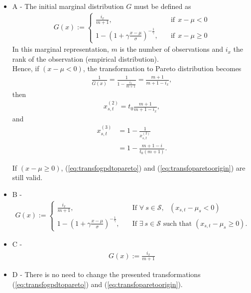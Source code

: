 \begin{itemize}
\item A - The initial marginal distribution $G$ must be defined as 
\begin{align*}
G(x) := \left\{
\begin{array}{rl}
  \frac{i_x}{m+1} , \quad &\text{if} \:\: x-\mu < 0 \\
  1 - \left( 1 + \gamma \frac{x - \mu}{{\sigma}} \right)^{-\frac{1}{\gamma}} , \quad &\text{if} \:\: x-\mu \geq 0 
\end{array}
\right.
\end{align*}
In this marginal representation, $m$ is the number of observations and $i_x$ the rank of the observation (empirical distribution).\\
Hence, if $(x-\mu < 0)$, the transformation to Pareto distribution becomes
\begin{align*}
\frac{1}{\overline{G}(x)} = \frac{1}{1-\frac{i_x}{m+1}} = \frac{m+1}{m+1-i_x},
\end{align*}
then
\begin{align*}
x^{(2)}_{s,t} = t_0 \frac{m+1}{m+1-i_x},
\end{align*}
and
\begin{align*}
x^{(3)}_{s,t} &= 1 - \frac{1}{x^{(2)}_{s,t}} \\
			&= 1 - \frac{m+1-i}{t_0 \left( m+1 \right) }.
\end{align*}

If  $(x-\mu \geq 0)$, (\ref{eq:transfogpdtopareto}) and (\ref{eq:transfoparetoorigin}) are still valid.

\item B - 
\begin{align*}
G(x) := \left\{
\begin{array}{rl}
  \frac{i_x}{m+1} , \quad &\text{If $\forall \: s \in \mathcal{S},$ $(x_{s,t} - \mu_{s} < 0)$} \\
  1 - \left( 1 + \gamma \frac{x - \mu}{{\sigma}} \right)^{-\frac{1}{\gamma}} , \quad &\text{If $\exists \: s \in \mathcal{S}$ such that $(x_{s,t} - \mu_{s} \geq 0)$}. 
\end{array}
\right.
\end{align*}
\item C - \begin{align*}
G(x) := \frac{i_x}{m+1}
\end{align*}
\item D - There is no need to change the presented transformations (\ref{eq:transfogpdtopareto}) and (\ref{eq:transfoparetoorigin}).
\end{itemize}

